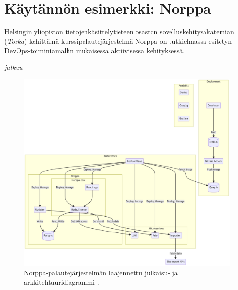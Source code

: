 \chapter{Käytännön esimerkki: Norppa\label{example}}

Helsingin yliopiston tietojenkäsittelytieteen osaston sovelluskehitysakatemian (\textit{Toska}) \cite{Tenhunen23} kehittämä kurssipalautejärjestelmä Norppa on tutkielmassa esitetyn DevOps-toimintamallin mukaisessa aktiivisessa kehityksessä.

\textit{jatkuu}

\begin{figure}[ht]
\begin{center}
\includegraphics[width=1\textwidth]{figures/norppa_diagram.png}
\caption{Norppa-palautejärjestelmän laajennettu julkaisu- ja arkkitehtuuridiagrammi \cite{Norppa23}\label{fig:norppa}.}
\end{center}
\end{figure}
